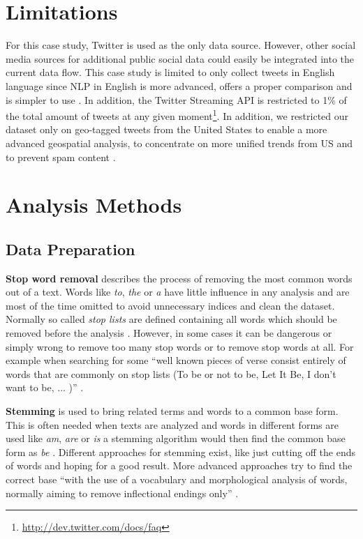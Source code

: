 \section{Limitations}
\label{sec:setup}
For this case study, Twitter is used as the only data source. However, other social media sources for additional public social data could easily be integrated into the current data flow. This case study is limited to only collect tweets in English language since NLP in English is more advanced, offers a proper comparison and is simpler to use . In addition, the Twitter Streaming API is restricted to 1\% of the total amount of tweets at any given moment\footnote{\url{http://dev.twitter.com/docs/faq} \accessednote}. In addition, we restricted our dataset only on geo-tagged tweets from the United States to enable a more advanced geospatial analysis, to concentrate on more unified trends from US and to prevent spam content .

\section{Analysis Methods}
\label{sec:analysis-methods}

\subsection{Data Preparation}
\label{subsec:data-preparation}

\textbf{Stop word removal} describes the process of removing the most common words out of a text. Words like \textit{to}, \textit{the} or \textit{a} have little influence in any analysis and are most of the time omitted to avoid unnecessary indices and clean the dataset. Normally so called \textit{stop lists} are defined containing all words which should be removed before the analysis \cite[27]{manning2008introduction}. However, in some cases it can be dangerous or simply wrong to remove too many stop words or to remove stop words at all. For example when searching for some \enquote{well known pieces of verse consist entirely of words that are commonly on stop lists (To be or not to be, Let It Be, I don’t want to be, ... )} \cite[27]{manning2008introduction}.

\textbf{Stemming} is used to bring related terms and words to a common base form. This is often needed when texts are analyzed and words in different forms are used like \textit{am}, \textit{are} or \textit{is} a stemming algorithm would then find the common base form as \textit{be} \cite[32]{manning2008introduction}. Different approaches for stemming exist, like just cutting off the ends of words and hoping for a good result. More advanced approaches try to find the correct base \enquote{with the use of a vocabulary and morphological analysis of words, normally aiming to remove inflectional endings only} \cite[32]{manning2008introduction}.

